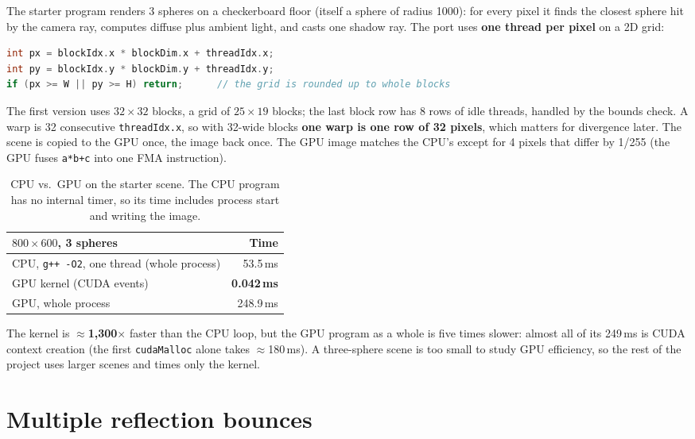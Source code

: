 \documentclass[11pt,a4paper]{article}
\begin{document}
The starter program renders 3 spheres on a checkerboard floor (itself a sphere of radius 1000): for
every pixel it finds the closest sphere hit by the camera ray, computes diffuse plus ambient light,
and casts one shadow ray. The port uses \textbf{one thread per pixel} on a 2D grid:
\begin{lstlisting}[language=C++]
int px = blockIdx.x * blockDim.x + threadIdx.x;
int py = blockIdx.y * blockDim.y + threadIdx.y;
if (px >= W || py >= H) return;      // the grid is rounded up to whole blocks
\end{lstlisting}
The first version uses $32 \times 32$ blocks, a grid of $25 \times 19$ blocks; the last block row has
8 rows of idle threads, handled by the bounds check. A warp is 32 consecutive \texttt{threadIdx.x},
so with 32-wide blocks \textbf{one warp is one row of 32 pixels}, which matters for divergence later.
The scene is copied to the GPU once, the image back once. The GPU image matches the CPU's except for
4 pixels that differ by 1/255 (the GPU fuses \texttt{a*b+c} into one FMA instruction).

\begin{table}[h]
  \centering
  \begin{tabular}{@{}lr@{}}
    \toprule
    $800 \times 600$, 3 spheres & Time \\
    \midrule
    CPU, \texttt{g++ -O2}, one thread (whole process) & 53.5\,ms \\
    GPU kernel (CUDA events) & \textbf{0.042\,ms} \\
    GPU, whole process & 248.9\,ms \\
    \bottomrule
  \end{tabular}
  \caption{CPU vs.\ GPU on the starter scene. The CPU program has no internal timer, so its time
    includes process start and writing the image.}
  \label{tab:cpugpu}
\end{table}

The kernel is $\approx$\textbf{1,300$\times$} faster than the CPU loop, but the GPU program as a whole
is five times slower: almost all of its 249\,ms is CUDA context creation (the first
\texttt{cudaMalloc} alone takes $\approx$180\,ms). A three-sphere scene is too small to study GPU
efficiency, so the rest of the project uses larger scenes and times only the kernel.

\section{Multiple reflection bounces}
\label{sec:multibounce}
\end{document}
